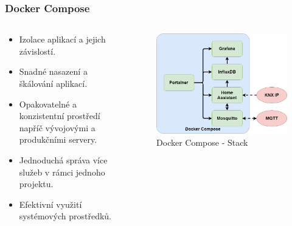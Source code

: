 \documentclass[%
  12pt,       				%
	t,                  %
	aspectratio=1610,   %
	unicode,						%
]{beamer}				    	%
\begin{document}
\begin{frame} 
	\frametitle{Docker Compose}
	\begin{columns}
		\begin{column}{0.6\textwidth}
			\begin{itemize}
				\item Izolace aplikací a jejich závislostí. %
				\item Snadné nasazení a škálování aplikací.
				\item Opakovatelné a konzistentní prostředí napříč vývojovými a produkčními servery.
				\item Jednoduchá správa více služeb v rámci jednoho projektu.
				\item Efektivní využití systémových prostředků.
			\end{itemize}
		\end{column}
		\begin{column}{0.4\textwidth}
			\begin{figure} [!ht]	
				\centering
				\includegraphics[width=1\columnwidth]{obrazky/stack.png}
				\caption{Docker Compose - Stack}
			\end{figure}
		\end{column}
	\end{columns}
\end{frame}
\end{document}
